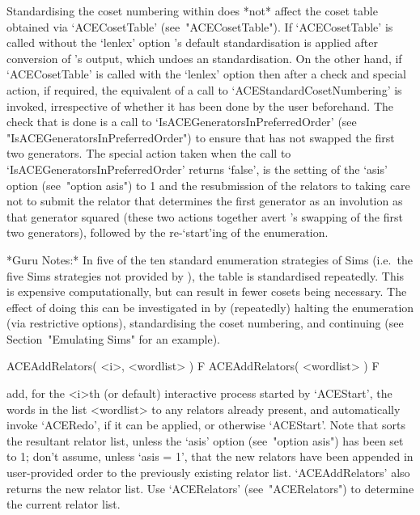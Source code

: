 Standardising the coset numbering within {\ACE} does *not* affect  the
{\GAP} coset table obtained via `ACECosetTable' (see~"ACECosetTable").
If `ACECosetTable' is called  without  the  `lenlex'  option  {\GAP}'s
default  standardisation  is  applied  after  conversion  of  {\ACE}'s
output, which undoes an {\ACE} standardisation. On the other hand,  if
`ACECosetTable' is called with the `lenlex' option then after a  check
and  special  action,  if  required,  the  equivalent  of  a  call  to
`ACEStandardCosetNumbering' is invoked, irrespective of whether it has
been done by the user beforehand. The check that is done is a call  to
`IsACEGeneratorsInPreferredOrder'                                 (see
"IsACEGeneratorsInPreferredOrder")  to  ensure  that  {\ACE}  has  not
swapped the first two generators. The special action  taken  when  the
call to  `IsACEGeneratorsInPreferredOrder'  returns  `false',  is  the
setting of  the  `asis'  option  (see~"option  asis")  to  1  and  the
resubmission of the relators to {\ACE} taking care not to  submit  the
relator that determines the first generator as an involution  as  that
generator squared (these two actions together avert {\ACE}'s  swapping
of the first two generators), followed by  the  re-`start'ing  of  the
enumeration.

*Guru Notes:*
In  five  of  the  ten  standard  enumeration   strategies   of   Sims
\cite{Sim94} (i.e.~the five Sims strategies not provided  by  {\ACE}),
the   table   is   standardised   repeatedly.   This   is    expensive
computationally, but can result in fewer cosets being  necessary.  The
effect of doing this can be investigated  in  {\ACE}  by  (repeatedly)
halting the enumeration (via restrictive options),  standardising  the
coset numbering, and continuing (see Section~"Emulating Sims"  for  an
example).

\>ACEAddRelators( <i>, <wordlist> ) F
\>ACEAddRelators( <wordlist> ) F

add, for the <i>th (or default) interactive {\ACE} process started  by
`ACEStart', the words in the list <wordlist> to any  relators  already
present, and automatically invoke `ACERedo', if it can be applied,  or
otherwise `ACEStart'. Note that {\ACE}  sorts  the  resultant  relator
list, unless the `asis' option (see~"option asis") has been set to  1;
don't assume, unless `asis = 1',  that  the  new  relators  have  been
appended in user-provided order to  the  previously  existing  relator
list.  `ACEAddRelators'  also  returns  the  new  relator  list.   Use
`ACERelators' (see~"ACERelators") to  determine  the  current  relator
list.


